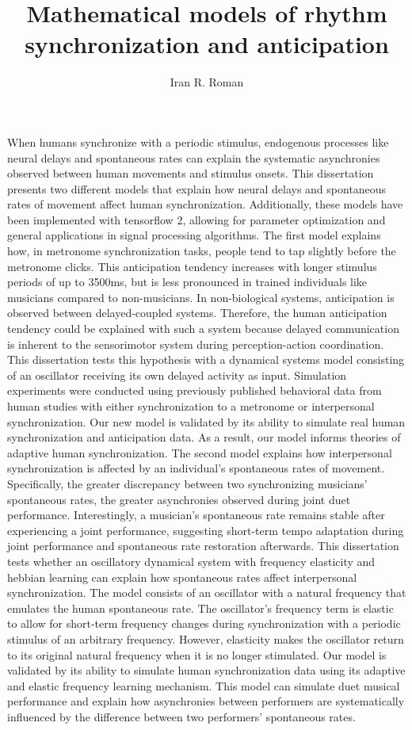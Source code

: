 \documentclass{report}
\begin{document}
\title{Mathematical models of rhythm synchronization and anticipation}
\author{Iran R. Roman}

\beforepreface

When humans synchronize with a periodic stimulus, endogenous processes like neural delays and spontaneous rates can explain the systematic asynchronies observed between human movements and stimulus onsets. This dissertation presents two different models that explain how neural delays and spontaneous rates of movement affect human synchronization. Additionally, these models have been implemented with tensorflow 2, allowing for parameter optimization and general applications in signal processing algorithms.
The first model explains how, in metronome synchronization tasks, people tend to tap slightly before the metronome clicks. This anticipation tendency increases with longer stimulus periods of up to 3500ms, but is less pronounced in trained individuals like musicians compared to non-musicians. In non-biological systems, anticipation is observed between delayed-coupled systems. Therefore, the human anticipation tendency could be explained with such a system because delayed communication is inherent to the sensorimotor system during perception-action coordination. This dissertation tests this hypothesis with a dynamical systems model consisting of an oscillator receiving its own delayed activity as input. Simulation experiments were conducted using previously published behavioral data from human studies with either synchronization to a metronome or interpersonal synchronization. Our new model is validated by its ability to simulate real human synchronization and anticipation data. As a result, our model informs theories of adaptive human synchronization.
The second model explains how interpersonal synchronization is affected by an individual’s spontaneous rates of movement. Specifically, the greater discrepancy between two synchronizing musicians' spontaneous rates, the greater asynchronies observed during joint duet performance. Interestingly, a musician's spontaneous rate remains stable after experiencing a joint performance, suggesting short-term tempo adaptation during joint performance and spontaneous rate restoration afterwards. This dissertation tests whether an oscillatory dynamical system with frequency elasticity and hebbian learning can explain how spontaneous rates affect interpersonal synchronization. The model consists of an oscillator with a natural frequency that emulates the human spontaneous rate. The oscillator’s frequency term is elastic to allow for short-term frequency changes during synchronization with a periodic stimulus of an arbitrary frequency. However, elasticity makes the oscillator return to its original natural frequency when it is no longer stimulated. Our model is validated by its ability to simulate human synchronization data using its adaptive and elastic frequency learning mechanism. This model can simulate duet musical performance and explain how asynchronies between performers are systematically influenced by the difference between two performers’ spontaneous rates.
\end{document}
